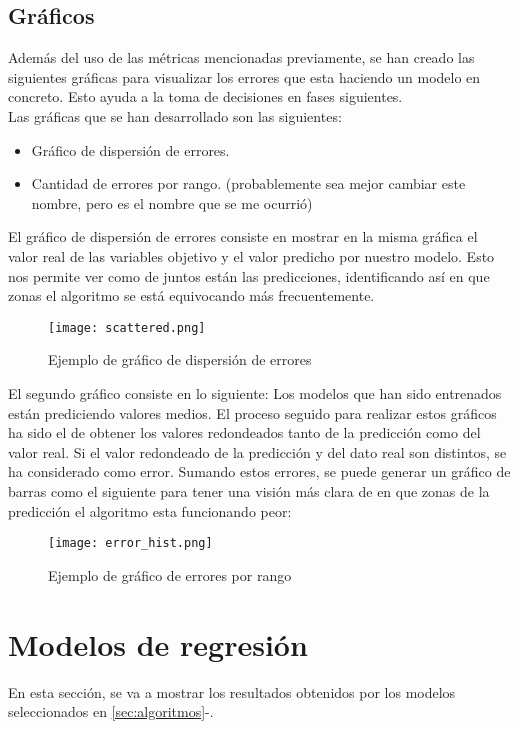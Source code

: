 \subsection{Gráficos}
Además del uso de las métricas mencionadas previamente, se han creado las siguientes gráficas para visualizar los errores que esta haciendo un modelo en concreto. Esto ayuda a la toma de decisiones en fases siguientes.\\
Las gráficas que se han desarrollado son las siguientes:
\begin{itemize}
	\item Gráfico de dispersión de errores.
	\item Cantidad de errores por rango. (probablemente sea mejor cambiar este nombre, pero es el nombre que se me ocurrió)
\end{itemize}
El gráfico de dispersión de errores consiste en mostrar en la misma gráfica el valor real de las variables objetivo y el valor predicho por nuestro modelo. Esto nos permite ver como de juntos están las predicciones, identificando así en que zonas el algoritmo se está equivocando más frecuentemente.\\
\begin{figure}[H]
	\centering
	\texttt{[image: scattered.png]}
	\caption{Ejemplo de gráfico de dispersión de errores}
	\label{fig:scattered_example}
\end{figure}

El segundo gráfico consiste en lo siguiente:
Los modelos que han sido entrenados están prediciendo valores medios. El proceso seguido para realizar estos gráficos ha sido el de obtener los valores redondeados tanto de la predicción como del valor real. Si el valor redondeado de la predicción y del dato real son distintos, se ha considerado como error. Sumando estos errores, se puede generar un gráfico de barras como el siguiente para tener una visión más clara de en que zonas de la predicción el algoritmo esta funcionando peor:
\linebreak
\begin{figure}[H]
	\centering
	\texttt{[image: error\_hist.png]}
	\caption{Ejemplo de gráfico de errores por rango}
	\label{fig:error_hist_example}
\end{figure}
\section{Modelos de regresión}
En esta sección, se va a mostrar los resultados obtenidos por los modelos seleccionados en \ref{sec:algoritmos}-.
